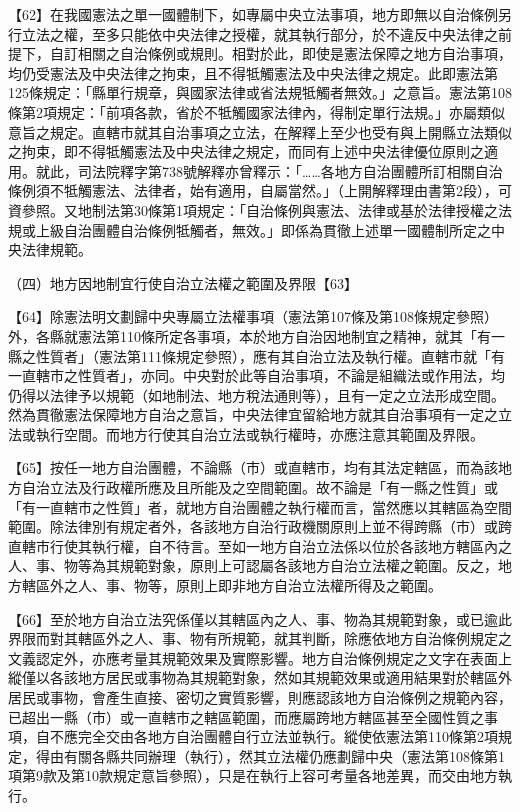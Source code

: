 \documentclass{ctexart} %
\begin{document}
{

【62】在我國憲法之單一國體制下，如專屬中央立法事項，地方即無以自治條例另行立法之權，至多只能依中央法律之授權，就其執行部分，於不違反中央法律之前提下，自訂相關之自治條例或規則。相對於此，即使是憲法保障之地方自治事項，均仍受憲法及中央法律之拘束，且不得牴觸憲法及中央法律之規定。此即憲法第125條規定：「縣單行規章，與國家法律或省法規牴觸者無效。」之意旨。憲法第108條第2項規定：「前項各款，省於不牴觸國家法律內，得制定單行法規。」亦屬類似意旨之規定。直轄市就其自治事項之立法，在解釋上至少也受有與上開縣立法類似之拘束，即不得牴觸憲法及中央法律之規定，而同有上述中央法律優位原則之適用。就此，司法院釋字第738號解釋亦曾釋示：「……各地方自治團體所訂相關自治條例須不牴觸憲法、法律者，始有適用，自屬當然。」（上開解釋理由書第2段），可資參照。又地制法第30條第1項規定：「自治條例與憲法、法律或基於法律授權之法規或上級自治團體自治條例牴觸者，無效。」即係為貫徹上述單一國體制所定之中央法律規範。


（四）地方因地制宜行使自治立法權之範圍及界限【63】

【64】除憲法明文劃歸中央專屬立法權事項（憲法第107條及第108條規定參照）外，各縣就憲法第110條所定各事項，本於地方自治因地制宜之精神，就其「有一縣之性質者」（憲法第111條規定參照），應有其自治立法及執行權。直轄市就「有一直轄市之性質者」，亦同。中央對於此等自治事項，不論是組織法或作用法，均仍得以法律予以規範（如地制法、地方稅法通則等），且有一定之立法形成空間。然為貫徹憲法保障地方自治之意旨，中央法律宜留給地方就其自治事項有一定之立法或執行空間。而地方行使其自治立法或執行權時，亦應注意其範圍及界限。

【65】按任一地方自治團體，不論縣（市）或直轄市，均有其法定轄區，而為該地方自治立法及行政權所應及且所能及之空間範圍。故不論是「有一縣之性質」或「有一直轄市之性質」者，就地方自治團體之執行權而言，當然應以其轄區為空間範圍。除法律別有規定者外，各該地方自治行政機關原則上並不得跨縣（市）或跨直轄市行使其執行權，自不待言。至如一地方自治立法係以位於各該地方轄區內之人、事、物等為其規範對象，原則上可認屬各該地方自治立法權之範圍。反之，地方轄區外之人、事、物等，原則上即非地方自治立法權所得及之範圍。

【66】至於地方自治立法究係僅以其轄區內之人、事、物為其規範對象，或已逾此界限而對其轄區外之人、事、物有所規範，就其判斷，除應依地方自治條例規定之文義認定外，亦應考量其規範效果及實際影響。地方自治條例規定之文字在表面上縱僅以各該地方居民或事物為其規範對象，然如其規範效果或適用結果對於轄區外居民或事物，會產生直接、密切之實質影響，則應認該地方自治條例之規範內容，已超出一縣（市）或一直轄市之轄區範圍，而應屬跨地方轄區甚至全國性質之事項，自不應完全交由各地方自治團體自行立法並執行。縱使依憲法第110條第2項規定，得由有關各縣共同辦理（執行），然其立法權仍應劃歸中央（憲法第108條第1項第9款及第10款規定意旨參照），只是在執行上容可考量各地差異，而交由地方執行。

}
\end{document}

